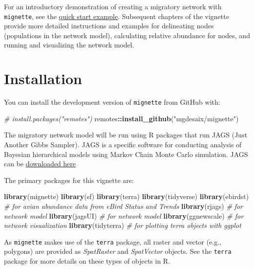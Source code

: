 \documentclass[
]{book}
\newenvironment{Shaded}{\begin{snugshade}}{\end{snugshade}}
\newcommand{\CommentTok}[1]{\textcolor[rgb]{0.56,0.35,0.01}{\textit{#1}}}
\newcommand{\FunctionTok}[1]{\textcolor[rgb]{0.13,0.29,0.53}{\textbf{#1}}}
\newcommand{\NormalTok}[1]{#1}
\newcommand{\SpecialCharTok}[1]{\textcolor[rgb]{0.81,0.36,0.00}{\textbf{#1}}}
\newcommand{\StringTok}[1]{\textcolor[rgb]{0.31,0.60,0.02}{#1}}
\begin{document}
For an introductory demonstration of creating a migratory network with \texttt{mignette}, see the \protect\hyperlink{quickstart}{quick start example}. Subsequent chapters of the vignette provide more detailed instructions and examples for delineating nodes (populations in the network model), calculating relative abundance for nodes, and running and visualizing the network model.

\hypertarget{installation}{%
\section{Installation}\label{installation}}

You can install the development version of \texttt{mignette} from GitHub with:

\begin{Shaded}
\begin{Highlighting}[]
\CommentTok{\# install.packages("remotes")}
\NormalTok{remotes}\SpecialCharTok{::}\FunctionTok{install\_github}\NormalTok{(}\StringTok{"mgdesaix/mignette"}\NormalTok{)}
\end{Highlighting}
\end{Shaded}

The migratory network model will be run using R packages that run JAGS (Just Another Gibbs Sampler). JAGS is a specific software for conducting analysis of Bayesian hierarchical models using Markov Chain Monte Carlo simulation. JAGS can be \href{https://mcmc-jags.sourceforge.io/}{downloaded here}

The primary packages for this vignette are:

\begin{Shaded}
\begin{Highlighting}[]
\FunctionTok{library}\NormalTok{(mignette)}
\FunctionTok{library}\NormalTok{(sf)}
\FunctionTok{library}\NormalTok{(terra)}
\FunctionTok{library}\NormalTok{(tidyverse)}
\FunctionTok{library}\NormalTok{(ebirdst) }\CommentTok{\# for avian abundance data from eBird Status and Trends}
\FunctionTok{library}\NormalTok{(rjags) }\CommentTok{\# for network model}
\FunctionTok{library}\NormalTok{(jagsUI) }\CommentTok{\# for network model}
\FunctionTok{library}\NormalTok{(ggnewscale) }\CommentTok{\# for network visualization}
\FunctionTok{library}\NormalTok{(tidyterra) }\CommentTok{\# for plotting terra objects with ggplot}
\end{Highlighting}
\end{Shaded}

As \texttt{mignette} makes use of the \texttt{terra} package, all raster and vector (e.g., polygons) are provided as \emph{SpatRaster} and \emph{SpatVector} objects. See the \texttt{terra} package for more details on these types of objects in R.
\end{document}
